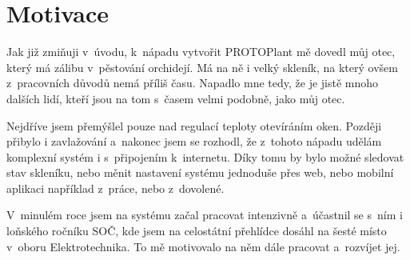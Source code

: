 \chapter{Motivace}
Jak již zmiňuji v~úvodu, k~nápadu vytvořit PROTOPlant mě dovedl můj otec, který má zálibu v~pěs\-to\-vá\-ní orchidejí.
Má na ně i velký skleník, na který ovšem z~pracovních důvodů nemá příliš času.
Napadlo mne tedy, že je jistě mnoho dalších lidí, kteří jsou na tom s~časem velmi podobně, jako můj otec.

Nejdříve jsem přemýšlel pouze nad regulací teploty otevíráním oken.
Později přibylo i zavlažování a~nakonec jsem se rozhodl, že z~tohoto nápadu udělám komplexní systém i s~připojením k~internetu.
Díky tomu by bylo možné sledovat stav skleníku, nebo měnit nastavení systému jednoduše přes web, nebo mobilní aplikaci například z~práce, nebo z~dovolené. 

V~minulém roce jsem na systému začal pracovat intenzivně a~účastnil se s~ním i loňského ročníku SOČ, kde jsem na celostátní přehlídce dosáhl na šesté místo v~oboru Elektrotechnika.
To mě motivovalo na něm dále pracovat a~rozvíjet jej.

\fxnote[author=PŠ]{\textcolor{mygreen}{Zde je ještě potřeba provést úpravy.}}

\newpage